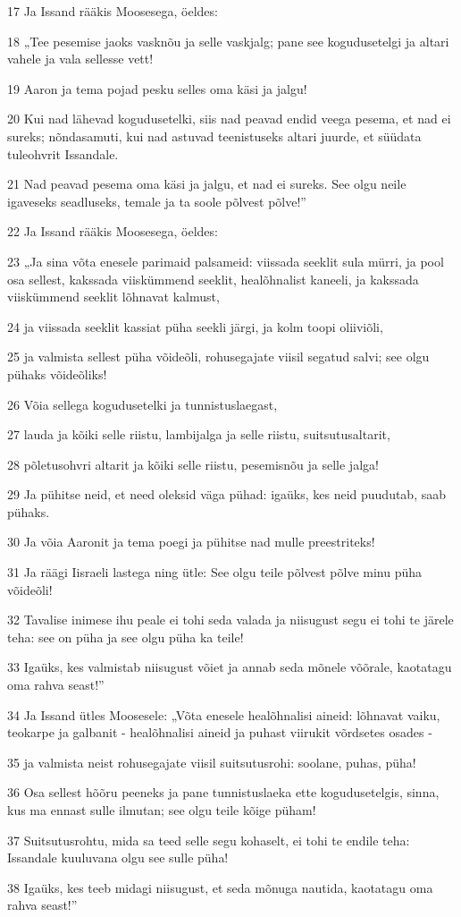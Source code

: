 \par 17 Ja Issand rääkis Moosesega, öeldes:
\par 18 „Tee pesemise jaoks vasknõu ja selle vaskjalg; pane see kogudusetelgi ja altari vahele ja vala sellesse vett!
\par 19 Aaron ja tema pojad pesku selles oma käsi ja jalgu!
\par 20 Kui nad lähevad kogudusetelki, siis nad peavad endid veega pesema, et nad ei sureks; nõndasamuti, kui nad astuvad teenistuseks altari juurde, et süüdata tuleohvrit Issandale.
\par 21 Nad peavad pesema oma käsi ja jalgu, et nad ei sureks. See olgu neile igaveseks seadluseks, temale ja ta soole põlvest põlve!”
\par 22 Ja Issand rääkis Moosesega, öeldes:
\par 23 „Ja sina võta enesele parimaid palsameid: viissada seeklit sula mürri, ja pool osa sellest, kakssada viiskümmend seeklit, healõhnalist kaneeli, ja kakssada viiskümmend seeklit lõhnavat kalmust,
\par 24 ja viissada seeklit kassiat püha seekli järgi, ja kolm toopi oliiviõli,
\par 25 ja valmista sellest püha võideõli, rohusegajate viisil segatud salvi; see olgu pühaks võideõliks!
\par 26 Võia sellega kogudusetelki ja tunnistuslaegast,
\par 27 lauda ja kõiki selle riistu, lambijalga ja selle riistu, suitsutusaltarit,
\par 28 põletusohvri altarit ja kõiki selle riistu, pesemisnõu ja selle jalga!
\par 29 Ja pühitse neid, et need oleksid väga pühad: igaüks, kes neid puudutab, saab pühaks.
\par 30 Ja võia Aaronit ja tema poegi ja pühitse nad mulle preestriteks!
\par 31 Ja räägi Iisraeli lastega ning ütle: See olgu teile põlvest põlve minu püha võideõli!
\par 32 Tavalise inimese ihu peale ei tohi seda valada ja niisugust segu ei tohi te järele teha: see on püha ja see olgu püha ka teile!
\par 33 Igaüks, kes valmistab niisugust võiet ja annab seda mõnele võõrale, kaotatagu oma rahva seast!”
\par 34 Ja Issand ütles Moosesele: „Võta enesele healõhnalisi aineid: lõhnavat vaiku, teokarpe ja galbanit - healõhnalisi aineid ja puhast viirukit võrdsetes osades -
\par 35 ja valmista neist rohusegajate viisil suitsutusrohi: soolane, puhas, püha!
\par 36 Osa sellest hõõru peeneks ja pane tunnistuslaeka ette kogudusetelgis, sinna, kus ma ennast sulle ilmutan; see olgu teile kõige püham!
\par 37 Suitsutusrohtu, mida sa teed selle segu kohaselt, ei tohi te endile teha: Issandale kuuluvana olgu see sulle püha!
\par 38 Igaüks, kes teeb midagi niisugust, et seda mõnuga nautida, kaotatagu oma rahva seast!”

